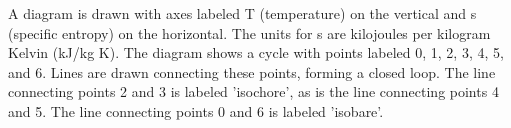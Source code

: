 A diagram is drawn with axes labeled T (temperature) on the vertical and s (specific entropy) on the horizontal. The units for s are kilojoules per kilogram Kelvin (kJ/kg K). The diagram shows a cycle with points labeled 0, 1, 2, 3, 4, 5, and 6. Lines are drawn connecting these points, forming a closed loop. The line connecting points 2 and 3 is labeled 'isochore', as is the line connecting points 4 and 5. The line connecting points 0 and 6 is labeled 'isobare'.